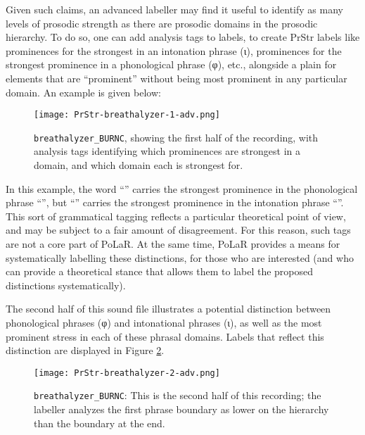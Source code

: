 Given such claims, an advanced labeller may find it useful to identify as many levels of prosodic strength as there are prosodic domains in the prosodic hierarchy. To do so, one can add analysis tags to \textlabel{*} labels, to create PrStr labels like  prominences for the strongest \textlabel{*} in an intonation phrase (ι),  prominences for the strongest prominence in a phonological phrase (φ), etc., alongside a plain \textlabel{*} for elements that are “prominent” without being most prominent in any particular domain. An example is given below:

\begin{figure}[H]
\centering
%
\texttt{[image: PrStr-breathalyzer-1-adv.png]}
%
\caption[\texttt{breathalyzer\_BURNC}, with analysis tags identifying which prominences are strongest in a domain, and which domain each is strongest for.]{\texttt{breathalyzer\_BURNC}, showing the first half of the recording, with analysis tags identifying which prominences are strongest in a domain, and which domain each is strongest for.%
\label{fig:breathalyzer Beyond}%
}
\end{figure}

In this example, the word “” carries the strongest prominence in the phonological phrase “”, but “” carries the strongest prominence in the intonation phrase “”. This sort of grammatical tagging reflects a particular theoretical point of view, and may be subject to a fair amount of disagreement. For this reason, such tags are not a core part of PoLaR. At the same time, PoLaR provides a means for systematically labelling these distinctions, for those who are interested (and who can provide a theoretical stance that allows them to label the proposed  distinctions systematically).

The second half of this sound file illustrates a potential distinction between phonological phrases (φ) and intonational phrases (ι), as well as the most prominent stress in each of these phrasal domains. Labels that reflect this distinction are displayed in Figure \ref{fig:breathalyzer Beyond}.

\begin{figure}[H]
\centering
%
\texttt{[image: PrStr-breathalyzer-2-adv.png]}
%
\caption[The labeller analyzes the first phrase boundary as lower on the hierarchy than the boundary at the end.]{\texttt{breathalyzer\_BURNC}: This is the second half of this recording; the labeller analyzes the first phrase boundary as lower on the hierarchy than the boundary at the end.%
\label{fig:breathalyzer Beyond}%
}
\end{figure}

